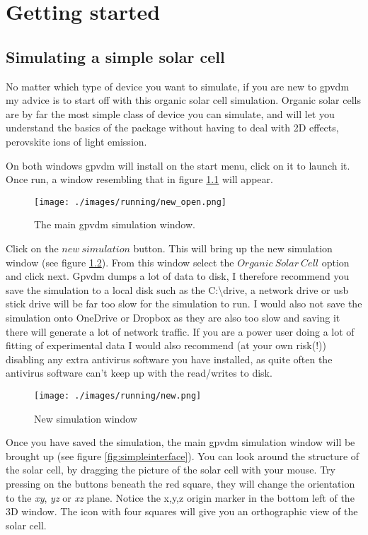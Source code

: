 \chapter{Getting started}
\section{Simulating a simple solar cell}
No matter which type of device you want to simulate, if you are new to gpvdm my advice is to start off with this organic solar cell simulation. Organic solar cells are by far the most simple class of device you can simulate, and will let you understand the basics of the package without having to deal with 2D effects, perovskite ions of light emission. 

On both windows gpvdm will install on the start menu, click on it to launch it.  Once run, a window resembling that in figure \ref{fig:new_open} will appear.  

\begin{figure}[H]
\centering
\texttt{[image: ./images/running/new\_open.png]}
\caption{The main gpvdm simulation window.}
\label{fig:new_open}
\end{figure}

Click on the $new~simulation$ button.  This will bring up the new simulation window (see figure \ref{fig:new_new}).  From this window select the $Organic~Solar~Cell$ option and click next.  Gpvdm dumps a lot of data to disk, I therefore recommend you save the simulation to a local disk such as the C:\textbackslash drive, a network drive or usb stick drive will be far too slow for the simulation to run.  I would also not save the simulation onto OneDrive or Dropbox as they are also too slow and saving it there will generate a lot of network traffic.  If you are a power user doing a lot of fitting of experimental data I would also recommend (at your own risk(!)) disabling any extra antivirus software you have installed, as quite often the antivirus software can't keep up with the read/writes to disk.

\begin{figure}[H]
\centering
\texttt{[image: ./images/running/new.png]}
\caption{New simulation window}
\label{fig:new_new}
\end{figure}

Once you have saved the simulation, the main gpvdm simulation window will be brought up (see figure \ref{fig:simpleinterface}). You can look around the structure of the solar cell, by dragging the picture of the solar cell with your mouse.  Try pressing on the buttons beneath the red square, they will change the orientation to the \emph{xy}, \emph{yz} or \emph{xz} plane. Notice the x,y,z origin marker in the bottom left of the 3D window.  The icon with four squares will give you an orthographic view of the solar cell.


